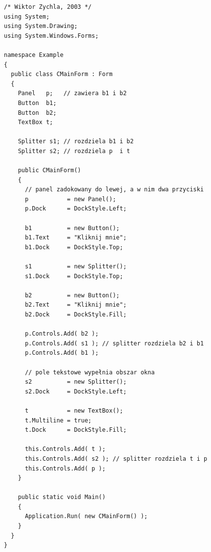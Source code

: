 \begin{scriptsize}
\begin{verbatim}
/* Wiktor Zychla, 2003 */
using System;
using System.Drawing;
using System.Windows.Forms;

namespace Example
{
  public class CMainForm : Form
  {   
    Panel   p;   // zawiera b1 i b2  
    Button  b1; 
    Button  b2; 
    TextBox t;

    Splitter s1; // rozdziela b1 i b2
    Splitter s2; // rozdziela p  i t

    public CMainForm()
    {
      // panel zadokowany do lewej, a w nim dwa przyciski
      p           = new Panel();
      p.Dock      = DockStyle.Left;      

      b1          = new Button();
      b1.Text     = "Kliknij mnie";
      b1.Dock     = DockStyle.Top;

      s1          = new Splitter();
      s1.Dock     = DockStyle.Top;

      b2          = new Button();
      b2.Text     = "Kliknij mnie";
      b2.Dock     = DockStyle.Fill;
      
      p.Controls.Add( b2 );
      p.Controls.Add( s1 ); // splitter rozdziela b2 i b1
      p.Controls.Add( b1 );

      // pole tekstowe wypełnia obszar okna
      s2          = new Splitter();
      s2.Dock     = DockStyle.Left;

      t           = new TextBox();
      t.Multiline = true; 
      t.Dock      = DockStyle.Fill;

      this.Controls.Add( t );
      this.Controls.Add( s2 ); // splitter rozdziela t i p
      this.Controls.Add( p );
    } 

    public static void Main()
    {
      Application.Run( new CMainForm() );
    }
  }
}
\end{verbatim}
\end{scriptsize}
